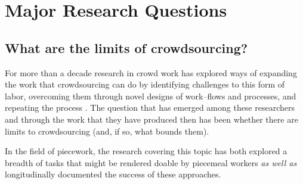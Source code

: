 \documentclass[trackingWork]{subfiles}
\begin{document}

\section{Major Research Questions}


\subsection{What are the limits of crowdsourcing?}
For more than a decade
research in crowd work has explored ways of expanding the work that crowdsourcing can do by
  identifying challenges to this form of labor,
  overcoming them through novel designs of work--flows and processes,
and repeating the process
\cite[etc\dots]{bernsteinSoylent}.
The question that has emerged
among these researchers and
through the work that they have produced then
has been whether there are limits to crowdsourcing
(and, if so, what bounds them).

In the field of piecework,
the research covering this topic has both explored
a breadth of tasks that might be rendered doable by piecemeal workers
\textit{as well as} longitudinally documented the success of these approaches.
\end{document}
